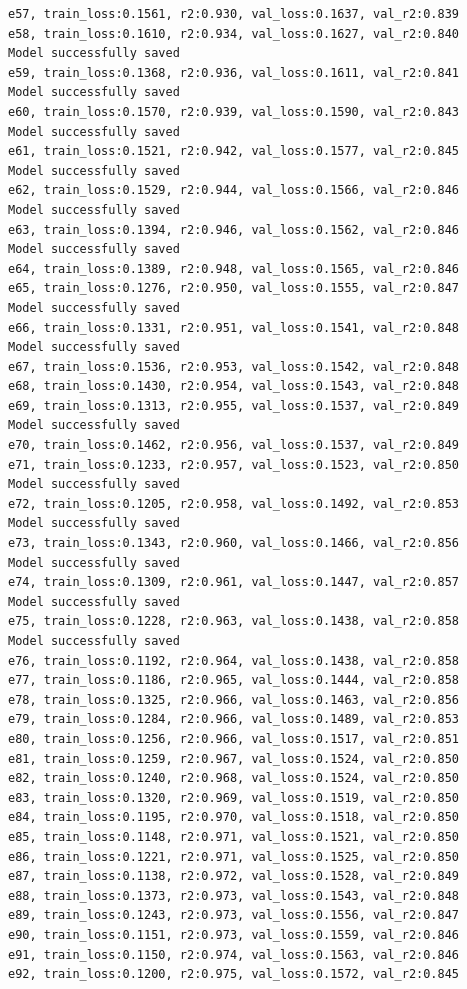 \documentclass[a4paper, 12pt]{article}
\begin{document}
\begin{lstlisting}
e57, train_loss:0.1561, r2:0.930, val_loss:0.1637, val_r2:0.839
e58, train_loss:0.1610, r2:0.934, val_loss:0.1627, val_r2:0.840
Model successfully saved
e59, train_loss:0.1368, r2:0.936, val_loss:0.1611, val_r2:0.841
Model successfully saved
e60, train_loss:0.1570, r2:0.939, val_loss:0.1590, val_r2:0.843
Model successfully saved
e61, train_loss:0.1521, r2:0.942, val_loss:0.1577, val_r2:0.845
Model successfully saved
e62, train_loss:0.1529, r2:0.944, val_loss:0.1566, val_r2:0.846
Model successfully saved
e63, train_loss:0.1394, r2:0.946, val_loss:0.1562, val_r2:0.846
Model successfully saved
e64, train_loss:0.1389, r2:0.948, val_loss:0.1565, val_r2:0.846
e65, train_loss:0.1276, r2:0.950, val_loss:0.1555, val_r2:0.847
Model successfully saved
e66, train_loss:0.1331, r2:0.951, val_loss:0.1541, val_r2:0.848
Model successfully saved
e67, train_loss:0.1536, r2:0.953, val_loss:0.1542, val_r2:0.848
e68, train_loss:0.1430, r2:0.954, val_loss:0.1543, val_r2:0.848
e69, train_loss:0.1313, r2:0.955, val_loss:0.1537, val_r2:0.849
Model successfully saved
e70, train_loss:0.1462, r2:0.956, val_loss:0.1537, val_r2:0.849
e71, train_loss:0.1233, r2:0.957, val_loss:0.1523, val_r2:0.850
Model successfully saved
e72, train_loss:0.1205, r2:0.958, val_loss:0.1492, val_r2:0.853
Model successfully saved
e73, train_loss:0.1343, r2:0.960, val_loss:0.1466, val_r2:0.856
Model successfully saved
e74, train_loss:0.1309, r2:0.961, val_loss:0.1447, val_r2:0.857
Model successfully saved
e75, train_loss:0.1228, r2:0.963, val_loss:0.1438, val_r2:0.858
Model successfully saved
e76, train_loss:0.1192, r2:0.964, val_loss:0.1438, val_r2:0.858
e77, train_loss:0.1186, r2:0.965, val_loss:0.1444, val_r2:0.858
e78, train_loss:0.1325, r2:0.966, val_loss:0.1463, val_r2:0.856
e79, train_loss:0.1284, r2:0.966, val_loss:0.1489, val_r2:0.853
e80, train_loss:0.1256, r2:0.966, val_loss:0.1517, val_r2:0.851
e81, train_loss:0.1259, r2:0.967, val_loss:0.1524, val_r2:0.850
e82, train_loss:0.1240, r2:0.968, val_loss:0.1524, val_r2:0.850
e83, train_loss:0.1320, r2:0.969, val_loss:0.1519, val_r2:0.850
e84, train_loss:0.1195, r2:0.970, val_loss:0.1518, val_r2:0.850
e85, train_loss:0.1148, r2:0.971, val_loss:0.1521, val_r2:0.850
e86, train_loss:0.1221, r2:0.971, val_loss:0.1525, val_r2:0.850
e87, train_loss:0.1138, r2:0.972, val_loss:0.1528, val_r2:0.849
e88, train_loss:0.1373, r2:0.973, val_loss:0.1543, val_r2:0.848
e89, train_loss:0.1243, r2:0.973, val_loss:0.1556, val_r2:0.847
e90, train_loss:0.1151, r2:0.973, val_loss:0.1559, val_r2:0.846
e91, train_loss:0.1150, r2:0.974, val_loss:0.1563, val_r2:0.846
e92, train_loss:0.1200, r2:0.975, val_loss:0.1572, val_r2:0.845

\end{lstlisting}
\end{document}
